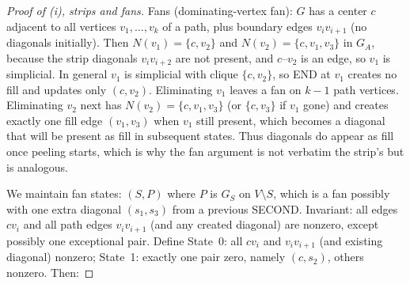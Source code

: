 \documentclass[11pt]{article}
\theoremstyle{plain}
\theoremstyle{definition}
\begin{document}
\begin{aiblock}
\begin{proof}[Proof of (i), strips and fans]
Fans (dominating-vertex fan): $G$ has a center $c$ adjacent to all vertices $v_1,\dots,v_k$ of a path, plus boundary edges $v_i v_{i+1}$ (no diagonals initially). Then $N(v_1)=\{c,v_2\}$ and $N(v_2)=\{c,v_1,v_3\}$ in $G_A$, because the strip diagonals $v_i v_{i+2}$ are not present, and $c$--$v_2$ is an edge, so $v_1$ is simplicial. In general $v_1$ is simplicial with clique $\{c,v_2\}$, so END at $v_1$ creates no fill and updates only $(c,v_2)$. Eliminating $v_1$ leaves a fan on $k-1$ path vertices. Eliminating $v_2$ next has $N(v_2)=\{c,v_1,v_3\}$ (or $\{c,v_3\}$ if $v_1$ gone) and creates exactly one fill edge $(v_1,v_3)$ when $v_1$ still present, which becomes a diagonal that will be present as fill in subsequent states. Thus diagonals do appear as fill once peeling starts, which is why the fan argument is not verbatim the strip's but is analogous.

We maintain fan states: $(S,P)$ where $P$ is $G_S$ on $V\setminus S$, which is a fan possibly with one extra diagonal $(s_1,s_3)$ from a previous SECOND. Invariant: all edges $c v_i$ and all path edges $v_i v_{i+1}$ (and any created diagonal) are nonzero, except possibly one exceptional pair. Define State~0: all $c v_i$ and $v_i v_{i+1}$ (and existing diagonal) nonzero; State~1: exactly one pair zero, namely $(c,s_2)$, others nonzero. Then:


\end{proof}
\end{aiblock}
\end{document}
